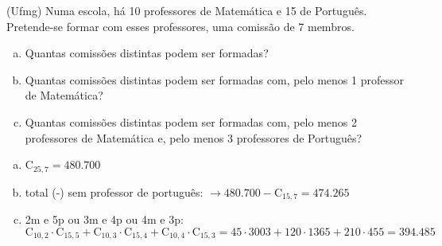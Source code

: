 \begin{ex}
(Ufmg) Numa escola, há 10 professores de Matemática e 15 de Português. Pretende-se formar com esses professores, uma comissão de 7 membros.
   \begin{enumerate}[(a)]
   \item Quantas comissões distintas podem ser formadas?
   \item Quantas comissões distintas podem ser formadas com, pelo menos 1 professor de Matemática?
   \item Quantas comissões distintas podem ser formadas com, pelo menos 2 professores de Matemática e, pelo menos 3 professores de Português?
   \end{enumerate}
     \begin{sol}
      \phantom{A}
        \begin{enumerate}  [(a)]
            \item $\mathrm{C}_{{25},7}=480.700$
            \item total (-) sem professor de português: $\rightarrow 480.700 - \mathrm{C}_{{15},7}= 474.265$
            \item 2m e 5p ou 3m e 4p ou 4m e 3p: \\ $\mathrm{C}_{{10},2}\cdot \mathrm{C}_{{15},5}+\mathrm{C}_{{10},3}\cdot \mathrm{C}_{{15},4}+\mathrm{C}_{{10},4}\cdot \mathrm{C}_{{15},3}=45\cdot3003+120\cdot1365+210\cdot455=394.485$
        \end{enumerate}
     \end{sol}
\end{ex}